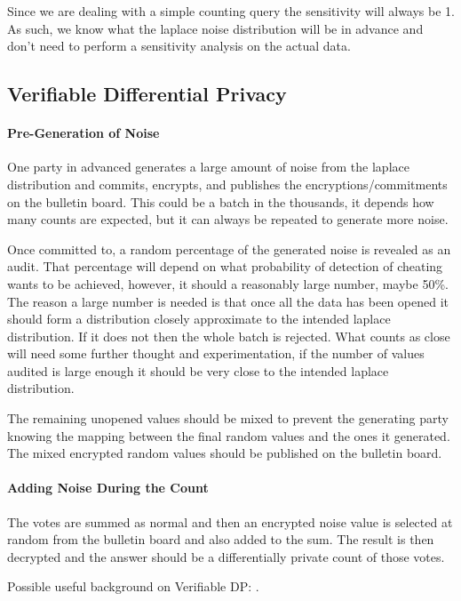 \documentclass[10pt,a4paper]{article}
\begin{document}
Since we are dealing with a simple counting query the sensitivity will always be 1. As such, we know what the laplace noise distribution will be in advance and don't need to perform a sensitivity analysis on the actual data.


\subsection{Verifiable Differential Privacy}

\paragraph{Pre-Generation of Noise}

One party in advanced generates a large amount of noise from the laplace distribution and commits, encrypts, and publishes the encryptions/commitments on the bulletin board. This could be a batch in the thousands, it depends how many counts are expected, but it can always be repeated to generate more noise.

Once committed to, a random percentage of the generated noise is revealed as an audit. That percentage will depend on what probability of detection of cheating wants to be achieved, however, it should a reasonably large number, maybe 50\%. The reason a large number is needed is that once all the data has been opened it should form a distribution closely approximate to the intended laplace distribution. If it does not then the whole batch is rejected. What counts as close will need some further thought and experimentation, if the number of values audited is large enough it should be very close to the intended laplace distribution.

The remaining unopened values should be mixed to prevent the generating party knowing the mapping between the final random values and the ones it generated. The mixed encrypted random values should be published on the bulletin board.

\paragraph{Adding Noise During the Count}

The votes are summed as normal and then an encrypted noise value is selected at random from the bulletin board and also added to the sum. The result is then decrypted and the answer should be a differentially private count of those votes.

Possible useful background on Verifiable DP: \cite{narayan2015verifiable,kato2021preventing}.




\end{document}
